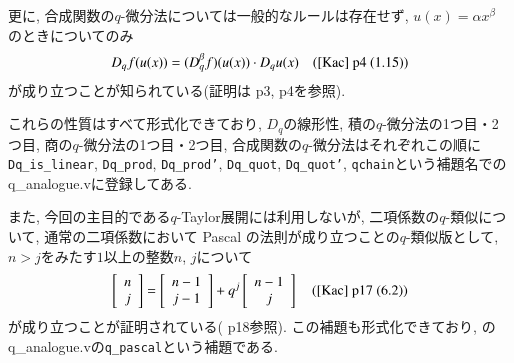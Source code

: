\documentclass[11pt]{jsreport}
\theoremstyle{mystyle}
\newcommand{\qcoe}[2]{\left[\begin{array}{ccc}#1\\#2\end{array}\right]}
\newcommand{\0}{\textbf{0}}
\begin{document}
更に, 合成関数の$q$-微分法については一般的なルールは存在せず, $u(x) = \alpha x^{\beta}$
のときについてのみ
\[
  D_q f (u (x)) = (D_q^{\beta} f)(u(x)) \cdot D_q u(x) \quad \text{(\cite{Kac} p4 (1.15))}
\]
が成り立つことが知られている(証明は\cite{Kac} p3, p4を参照). 

これらの性質はすべて形式化できており, $D_q$の線形性, 積の$q$-微分法の1つ目・2つ目, 商の$q$-微分法の1つ目・2つ目, 合成関数の$q$-微分法はそれぞれこの順に{\tt Dq\_is\_linear}, {\tt Dq\_prod}, {\tt Dq\_prod'}, {\tt Dq\_quot}, {\tt Dq\_quot'}, {\tt qchain}という補題名で\cite{coq ana}のq\_analogue.vに登録してある. 

また, 今回の主目的である$q$-Taylor展開には利用しないが, 二項係数の$q$-類似について, 通常の二項係数において Pascal の法則が成り立つことの$q$-類似版として, $n > j$をみたす$1$以上の整数$n$, $j$について
\[
  \qcoe{n}{j} = \qcoe{n - 1}{j - 1} + q^j \qcoe{n - 1}{j} \quad \text{(\cite{Kac} p17 (6.2))}
\]
が成り立つことが証明されている(\cite{Kac} p18参照). この補題も形式化できており, \cite{coq qana}のq\_analogue.vの{\tt q\_pascal}という補題である.
\end{document}
